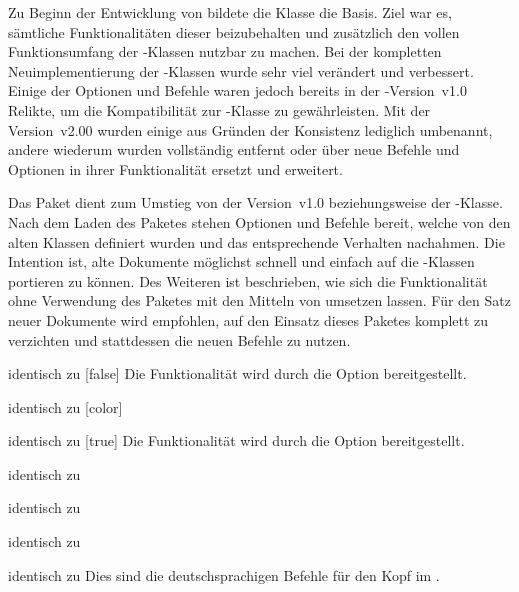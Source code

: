 \bigskip\noindent
Zu Beginn der Entwicklung von \TUDScript bildete die Klasse 
die Basis. Ziel war es, sämtliche Funktionalitäten dieser beizubehalten und 
zusätzlich den vollen Funktionsumfang der \KOMAScript-Klassen nutzbar zu 
machen. Bei der kompletten Neuimplementierung der \TUDScript-Klassen wurde sehr 
viel verändert und verbessert. Einige der Optionen und Befehle waren jedoch 
bereits in der \TUDScript-Version~v1.0 Relikte, um die Kompatibilität zur 
-Klasse zu gewährleisten. Mit der Version~v2.00 wurden einige 
aus Gründen der Konsistenz lediglich umbenannt, andere wiederum wurden 
vollständig entfernt oder über neue Befehle und Optionen in ihrer 
Funktionalität ersetzt und erweitert. 

Das Paket  dient zum Umstieg von \TUDScript der Version~v1.0
beziehungsweise der -Klasse. Nach dem Laden des Paketes stehen 
Optionen und Befehle bereit, welche von den alten Klassen definiert wurden und 
das entsprechende Verhalten nachahmen. Die Intention ist, alte Dokumente 
möglichst schnell und einfach auf die \TUDScript-Klassen portieren zu können. 
Des Weiteren ist beschrieben, wie sich die Funktionalität ohne Verwendung des 
Paketes mit den Mitteln von \TUDScript umsetzen lassen. Für den Satz neuer 
Dokumente wird empfohlen, auf den Einsatz dieses Paketes komplett zu verzichten 
und stattdessen die neuen Befehle zu nutzen.

\begin{Declaration}{}{%
  identisch zu [false]%
}
\printdeclarationlist%
%
Die Funktionalität wird durch die Option  bereitgestellt.
\end{Declaration}

\begin{Declaration}{}{%
  identisch zu [color]%
}
\begin{Declaration}{}{%
  identisch zu [true]%
}
\printdeclarationlist%
%
Die Funktionalität wird durch die Option  bereitgestellt.
\end{Declaration}
\end{Declaration}

\begin{Declaration}{}{%
  identisch zu 
}
\begin{Declaration}{}{%
  identisch zu 
}
\begin{Declaration}{}{%
  identisch zu 
}
\begin{Declaration}{}{%
  identisch zu 
}
\printdeclarationlist%
%
Dies sind die deutschsprachigen Befehle für den Kopf im \CD.
\end{Declaration}
\end{Declaration}
\end{Declaration}
\end{Declaration}

